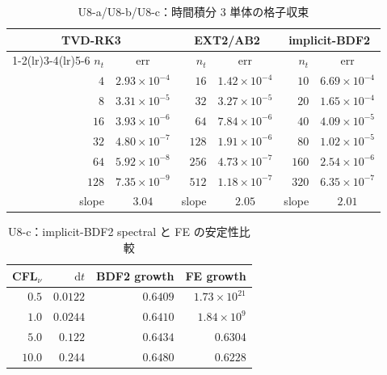 \begin{table}[!ht]
\caption{U8-a/U8-b/U8-c：時間積分 3 単体の格子収束}
\label{tab:U8_basic_orders}
\centering\small
\begin{tabular}{r c r c r c}
\toprule
\multicolumn{2}{c}{TVD-RK3} & \multicolumn{2}{c}{EXT2/AB2} & \multicolumn{2}{c}{implicit-BDF2} \\
\cmidrule(lr){1-2}\cmidrule(lr){3-4}\cmidrule(lr){5-6}
$n_t$ & err & $n_t$ & err & $n_t$ & err \\
\midrule
$4$   & $2.93\times 10^{-4}$ & $16$  & $1.42\times 10^{-4}$ & $10$   & $6.69\times 10^{-4}$ \\
$8$   & $3.31\times 10^{-5}$ & $32$  & $3.27\times 10^{-5}$ & $20$   & $1.65\times 10^{-4}$ \\
$16$  & $3.93\times 10^{-6}$ & $64$  & $7.84\times 10^{-6}$ & $40$   & $4.09\times 10^{-5}$ \\
$32$  & $4.80\times 10^{-7}$ & $128$ & $1.91\times 10^{-6}$ & $80$   & $1.02\times 10^{-5}$ \\
$64$  & $5.92\times 10^{-8}$ & $256$ & $4.73\times 10^{-7}$ & $160$  & $2.54\times 10^{-6}$ \\
$128$ & $7.35\times 10^{-9}$ & $512$ & $1.18\times 10^{-7}$ & $320$  & $6.35\times 10^{-7}$ \\
\midrule
slope & $\mathbf{3.04}$ & slope & $\mathbf{2.05}$ & slope & $\mathbf{2.01}$ \\
\bottomrule
\end{tabular}
\end{table}

\begin{table}[!ht]
\caption{U8-c：implicit-BDF2 spectral と FE の安定性比較}
\label{tab:U8_stability}
\centering\small
\begin{tabular}{r r r r}
\toprule
CFL$_\nu$ & $\mathrm{d}t$ & BDF2 growth & FE growth \\
\midrule
$0.5$  & $0.0122$ & $0.6409$ & $1.73\times 10^{21}$ \\
$1.0$  & $0.0244$ & $0.6410$ & $1.84\times 10^{9}$ \\
$5.0$  & $0.122$  & $0.6434$ & $0.6304$ \\
$10.0$ & $0.244$  & $0.6480$ & $0.6228$ \\
\bottomrule
\end{tabular}
\end{table}

